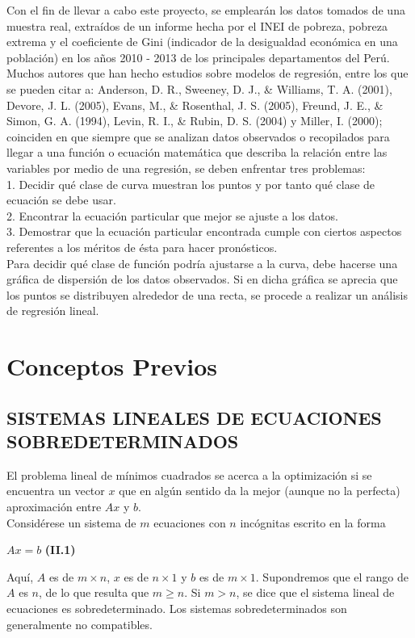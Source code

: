 \documentclass[twocolumn,twoside]{article}
\begin{document}
Con el fin de llevar a cabo este proyecto, se emplear\'an los datos tomados de una muestra real, 
extra\'idos de un informe hecha por el INEI de pobreza, pobreza extrema y el coeficiente de
Gini (indicador de la desigualdad econ\'omica en una poblaci\'on) en los a\~nos 2010 - 2013 de los
principales departamentos del Per\'u.\\

Muchos autores que han hecho estudios sobre
modelos de regresi\'on, entre los que se pueden
citar a: Anderson, D. R., Sweeney, D. J., \& Williams,
T. A. (2001), Devore, J. L. (2005), Evans, M., \&
Rosenthal, J. S. (2005), Freund, J. E., \& Simon,
G. A. (1994), Levin, R. I., \& Rubin, D. S. (2004)
y Miller, I. (2000); coinciden en que siempre que
se analizan datos observados o recopilados para 
llegar a una funci\'on o ecuaci\'on matem\'atica que
describa la relaci\'on entre las variables por medio de
una regresi\'on, se deben enfrentar tres problemas:\\
1. Decidir qu\'e clase de curva muestran los puntos
y por tanto qu\'e clase de ecuaci\'on se debe usar.\\
2. Encontrar la ecuaci\'on particular que mejor se
ajuste a los datos.\\
3. Demostrar que la ecuaci\'on particular encontrada
cumple con ciertos aspectos referentes a los m\'eritos 
de \'esta para hacer pron\'osticos.\\

Para decidir qu\'e clase de funci\'on podr\'ia ajustarse
a la curva, debe hacerse una gr\'afica de dispersi\'on
de los datos observados. Si en dicha gr\'afica se aprecia 
que los puntos se distribuyen alrededor de una recta, se 
procede a realizar un an\'alisis de regresi\'on lineal.


\section{Conceptos Previos}
\subsection{SISTEMAS LINEALES DE ECUACIONES SOBREDETERMINADOS}
\boldmath
El problema lineal de m\'inimos cuadrados se acerca a la optimizaci\'on
si se encuentra un vector $x$ que en alg\'un sentido da la mejor (aunque no la perfecta)
aproximaci\'on entre  $Ax$ y $b$.\\
Consid\'erese un sistema de $m$ ecuaciones con $n$ inc\'ognitas escrito en la forma 
\begin{center}
 $Ax=b$ \hspace{3cm}     \textbf{(II.1)}
\end{center}
Aqu\'i, $A$ es de $m\times n$, $x$ es de $n\times 1$ y $b$ es de $m\times 1$. Supondremos que el rango de $A$ es
$n$, de lo que resulta que $m\geq n$. Si $m> n$, se dice que el sistema lineal de ecuaciones es
sobredeterminado. Los sistemas sobredeterminados son generalmente no compatibles.
\end{document}
